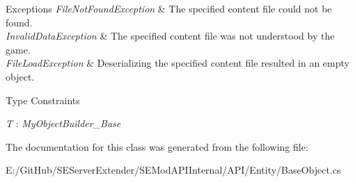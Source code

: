 \begin{DoxyExceptions}{Exceptions}
{\em File\+Not\+Found\+Exception} & The specified content file could not be found.\\
\hline
{\em Invalid\+Data\+Exception} & The specified content file was not understood by the game.\\
\hline
{\em File\+Load\+Exception} & Deserializing the specified content file resulted in an empty object.\\
\hline
\end{DoxyExceptions}
\begin{Desc}
\item[Type Constraints]\begin{description}
\item[{\em T} : {\em My\+Object\+Builder\+\_\+\+Base}]\end{description}
\end{Desc}


The documentation for this class was generated from the following file\+:\begin{DoxyCompactItemize}
\item 
E\+:/\+Git\+Hub/\+S\+E\+Server\+Extender/\+S\+E\+Mod\+A\+P\+I\+Internal/\+A\+P\+I/\+Entity/Base\+Object.\+cs\end{DoxyCompactItemize}
